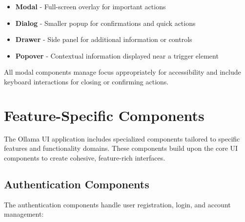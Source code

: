 \begin{itemize}
  \item \textbf{Modal} - Full-screen overlay for important actions
  \item \textbf{Dialog} - Smaller popup for confirmations and quick actions
  \item \textbf{Drawer} - Side panel for additional information or controls
  \item \textbf{Popover} - Contextual information displayed near a trigger element
\end{itemize}

All modal components manage focus appropriately for accessibility and include keyboard interactions for closing or confirming actions.

\section{Feature-Specific Components}

The Ollama UI application includes specialized components tailored to specific features and functionality domains. These components build upon the core UI components to create cohesive, feature-rich interfaces.

\subsection{Authentication Components}

The authentication components handle user registration, login, and account management:

